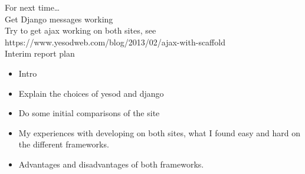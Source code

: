 \documentclass[a4paper,11pt]{article}
\begin{document}
For next time…\\
Get Django messages working\\
Try to get ajax working on both sites, see https://www.yesodweb.com/blog/2013/02/ajax-with-scaffold\\

Interim report plan
\begin{itemize}
  \item Intro
  \item Explain the choices of yesod and django
  \item Do some initial comparisons of the site
  \item My experiences with developing on both sites, what I found easy and hard on the different frameworks.
  \item Advantages and disadvantages of both frameworks.
\end{itemize}
\end{document}

